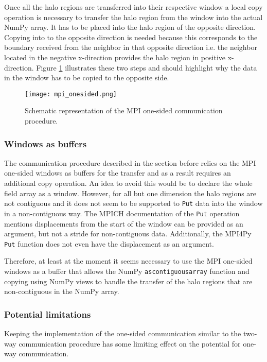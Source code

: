 Once all the halo regions are transferred into their respective window a local copy operation is necessary to transfer the halo region from the window into the actual NumPy array.
It has to be placed into the halo region of the opposite direction.
Copying into to the opposite direction is needed because this corresponds to the boundary received from the neighbor in that opposite direction i.e. the neighbor located in the negative x-direction provides the halo region in positive x-direction.
Figure \ref{fig:mpi_onesided_communication_flow} illustrates these two steps and should highlight why the data in the window has to be copied to the opposite side.

\begin{figure}
\centering
\texttt{[image: mpi\_onesided.png]}
\caption{Schematic representation of the MPI one-sided communication procedure.}
\label{fig:mpi_onesided_communication_flow}
\end{figure}

\subsubsection{Windows as buffers}
The communication procedure described in the section before relies on the MPI one-sided windows as buffers for the transfer and as a result requires an additional copy operation.
An idea to avoid this would be to declare the whole field array as a window.
However, for all but one dimension the halo regions are not contiguous and it does not seem to be supported to \texttt{Put} data into the window in a non-contiguous way.
The MPICH documentation of the \texttt{Put} operation mentions displacements from the start of the window can be provided as an argument, but not a stride for non-contiguous data.
Additionally, the MPI4Py \texttt{Put} function does not even have the displacement as an argument.

Therefore, at least at the moment it seems necessary to use the MPI one-sided windows as a buffer that allows the NumPy \texttt{ascontiguousarray} function and copying using NumPy views to handle the transfer of the halo regions that are non-contiguous in the NumPy array.

\subsubsection{Potential limitations}
Keeping the implementation of the one-sided communication similar to the two-way communication procedure has some limiting effect on the potential for one-way communication.

